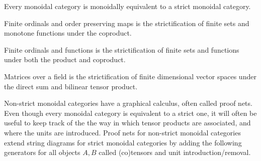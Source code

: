 \begin{theorem}
Every monoidal category is monoidally equivalent to a strict monoidal category. 
\end{theorem}

\begin{example}
Finite ordinals and order preserving maps is the strictification of finite sets and monotone functions under the coproduct.


Finite ordinals and functions is the strictification of finite sets and functions under both the product and coproduct.


Matrices over a field is the strictification of finite dimensional vector spaces under the direct sum and bilinear tensor product.
\end{example}


Non-strict monoidal categories have a graphical calculus, often called proof nets. 
Even though every monoidal category is equivalent to a strict one, it will often be useful to keep track of the the way in which tensor products are associated, and where the units are introduced. Proof nets for non-strict monoidal categories extend string diagrams for strict monoidal categories  by adding the following generators for all objects $A,B$ called (co)tensors and unit introduction/removal.



